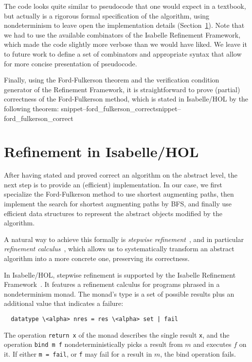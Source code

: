 \documentclass{llncs}
\newcommand{\isai}{\lstinline[language=isabelle,basicstyle=\normalsize\ttfamily\slshape]}
\newcommand{\Snippet}[1]{\ifcsname snippet--#1\endcsname\csname snippet--#1\endcsname\else\PackageError{}{No snippet '#1' defined.}{}\fi}
\begin{document}
The code looks quite similar to pseudocode that one would expect in a textbook, but actually is a rigorous formal specification of the algorithm, using nondeterminism to leave open the implementation details (\cf Section~\ref{sec:refinement}). Note that we had to use the available combinators of the Isabelle Refinement Framework, which made the code slightly more verbose than we would have liked. We leave it to future work to define a set of combinators and appropriate syntax that allow for more concise presentation of pseudocode.


Finally, using the Ford-Fulkerson theorem and the verification condition generator of the Refinement Framework, it is straightforward to prove (partial) correctness of
the Ford-Fulkerson method, which is stated in Isabelle/HOL by the following theorem:
\Snippet{ford_fulkerson_correct}

\section{Refinement in Isabelle/HOL}\label{sec:refinement}
After having stated and proved correct an algorithm on the abstract level, the next step is to provide an (efficient) implementation. 
In our case, we first specialize the Ford-Fulkerson method to use shortest augmenting paths, then implement the search for shortest augmenting paths by BFS, and finally use efficient data structures to represent the abstract objects modified by the algorithm. 

A natural way to achieve this formally is \emph{stepwise refinement}~\cite{Wirth71}, and in particular \emph{refinement calculus}~\cite{Back78,BaWr98}, which allows us to systematically transform an abstract algorithm into a more concrete one, preserving its correctness.

In Isabelle/HOL, stepwise refinement is supported by the Isabelle Refinement Framework~\cite{LaTu12,La12}. 
It features a refinement calculus for programs phrased in a nondeterminism monad. 
The monad's type is a set of possible results plus an additional value that indicates a failure:
\begin{lstlisting}
  datatype \<alpha> nres = res \<alpha> set | fail
\end{lstlisting}
The operation \isai{return x} of the monad describes the single result \isai{x}, and the 
operation \isai{bind m f} nondeterministically picks a result from $m$ and executes $f$ on it. 
If either \isai{m = fail}, or \isai{f} may fail for a result in $m$, the bind operation fails.
\end{document}
